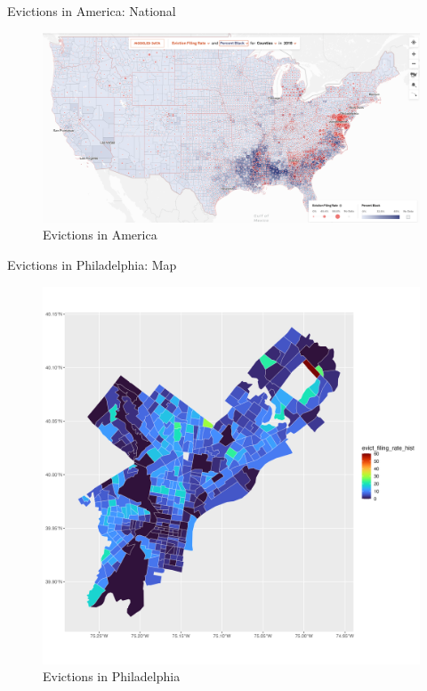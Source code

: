 \documentclass[10pt, xcolor=dvipsnames]{beamer}
\begin{document}
\begin{frame}{Evictions in America: National}
\begin{figure}
    \centering
    \includegraphics[width=0.65\linewidth]{figs/national-eviction-map.png}
    \caption{Evictions in America}
    \label{fig:natl-map}
\end{figure}
    
\end{frame}


\begin{frame}{Evictions in Philadelphia: Map}
\begin{figure}
    \centering
    \includegraphics[width=0.6\linewidth]{figs/evict_filing_rate_hist.png}
    \caption{Evictions in Philadelphia}
    \label{fig:philly-map}
\end{figure}
    
\end{frame}
\end{document}
